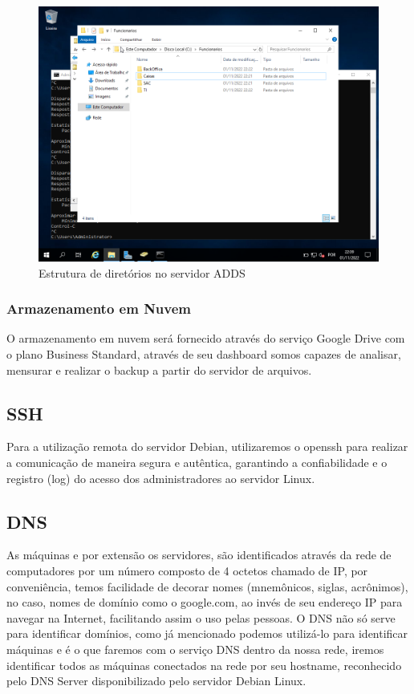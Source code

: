 \documentclass[12pt]{article}
\begin{document}
\begin{figure}[ht]
\centering
\includegraphics[height=0.5\textwidth]{adds-pasta-compartilhada.png}
\caption{Estrutura de diretórios no servidor ADDS}
\label{fig:adds-pastas}
\end{figure}

\subsubsection{Armazenamento em Nuvem}
O armazenamento em nuvem será fornecido através do serviço Google Drive  com o plano Business Standard, através de seu dashboard somos capazes de analisar, mensurar e realizar o backup a partir do servidor de arquivos.

\subsection{SSH}
Para a utilização remota do servidor Debian, utilizaremos o openssh para realizar a comunicação de maneira segura e autêntica, garantindo a confiabilidade e o registro (log) do acesso dos administradores ao servidor Linux.

\subsection{DNS}
As máquinas e por extensão os servidores, são identificados através da rede de computadores por um número composto de 4 octetos chamado de IP, por conveniência, temos facilidade de decorar nomes (mnemônicos, siglas, acrônimos), no caso, nomes de domínio como o google.com, ao invés de seu endereço IP para navegar na Internet, facilitando assim o uso pelas pessoas. O DNS não só serve para identificar domínios, como já mencionado podemos utilizá-lo para identificar máquinas e é o que faremos com o serviço DNS dentro da nossa rede, iremos identificar todos as máquinas conectados na rede por seu hostname, reconhecido pelo DNS Server disponibilizado pelo servidor Debian Linux.
\end{document}

